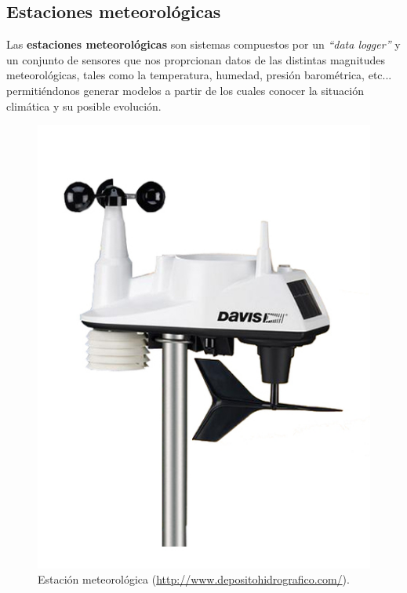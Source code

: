 \subsection{Estaciones meteorológicas}

Las \textbf{estaciones meteorológicas} son sistemas compuestos por un \textit{``data logger''} y un conjunto de sensores que nos proprcionan datos de las distintas magnitudes meteorológicas, tales como la temperatura, humedad, presión barométrica, etc... permitiéndonos generar modelos a partir de los cuales conocer la situación climática y su posible evolución. 

\bigskip
\begin{figure}[!ht]
  \begin{center}
  \includegraphics[width=1\textwidth]{../images/estacion.jpg}
  \caption{Estación meteorológica (\url{http://www.depositohidrografico.com/}).}
  \label{fig:diag_scrum}
  \end{center}
\end{figure}


